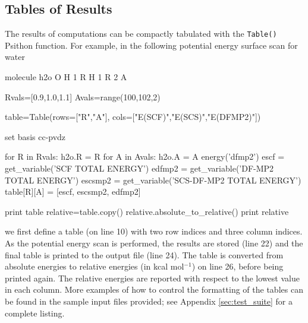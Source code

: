\subsection{Tables of Results}
The results of computations can be compactly tabulated with the {\tt Table()} Psithon
function. For example, in the following potential energy surface scan for water
\begin{Snippet}
molecule h2o {
  O
  H 1 R
  H 1 R 2 A
}

Rvals=[0.9,1.0,1.1]
Avals=range(100,102,2)

table=Table(rows=["R","A"], cols=["E(SCF)","E(SCS)","E(DFMP2)"])

set basis cc-pvdz

for R in Rvals:
    h2o.R = R
    for A in Avals:
        h2o.A = A
        energy('dfmp2')
        escf = get_variable('SCF TOTAL ENERGY')
        edfmp2 = get_variable('DF-MP2 TOTAL ENERGY')
        escsmp2 = get_variable('SCS-DF-MP2 TOTAL ENERGY')
        table[R][A] = [escf, escsmp2, edfmp2]

print table
relative=table.copy()
relative.absolute_to_relative()
print relative
\end{Snippet}
we first define a table (on line 10) with two row indices and three column
indices. As the potential energy scan is performed, the results are stored
(line 22) and the final table is printed to the output file (line 24). The
table is converted from absolute energies to relative energies (in kcal mol$^{-1}$)
on line 26, before being printed again. The relative energies are reported with
respect to the lowest value in each column. More examples of how to control the
formatting of the tables can be found in the sample input files provided; see
Appendix \ref{sec:test_suite} for a complete listing.
